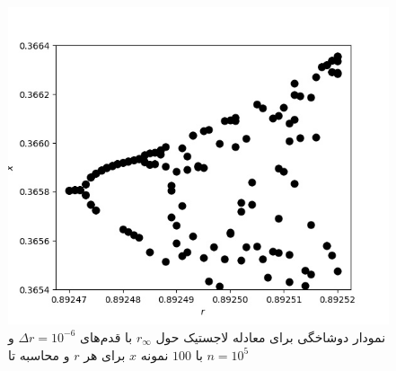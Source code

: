 \documentclass[11pt, a4paper]{article}
\begin{document}
\begin{figure}[h!]
	\centering
  \begin{minipage}[b]{0.42\textwidth}
    \includegraphics[width=\textwidth]{q4_0.89247_0.89252_51_100_100000.jpg}
    \caption{نمودار دوشاخگی برای معادله لاجستیک حول $r_\infty$ با قدم‌های $\Delta r = 10^{-6}$ و با $100$ نمونه $x$ برای هر $r$ و محاسبه تا $n = 10^5$}
    \label{fig:q4_r_infty}
  \end{minipage}
\end{figure}
\end{document}
